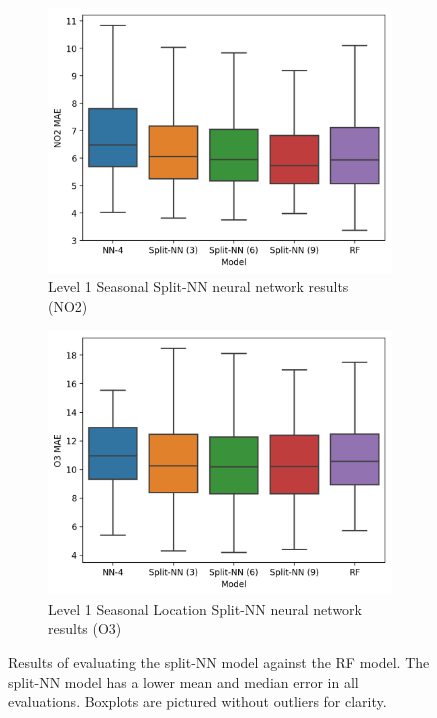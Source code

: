 \documentclass[journal abbreviation, manuscript]{copernicus}
\begin{document}
\begin{figure}[H]
\begin{subfigure}{0.45\textwidth}
\includegraphics[width=\textwidth]{results/split-no2-seasonal-mae}
\caption{Level 1 Seasonal Split-NN neural network results (NO2)}
\end{subfigure}
\begin{subfigure}{0.45\textwidth}
\includegraphics[width=\textwidth]{results/split-o3-seasonal-mae}
\caption{Level 1 Seasonal Location Split-NN neural network results (O3)}
\end{subfigure}
\caption{Results of evaluating the split-NN model against the RF model. The split-NN model has a lower mean and median error in all evaluations. Boxplots are pictured without outliers for clarity.}
\label{fig:split-results}
\end{figure}
\end{document}
